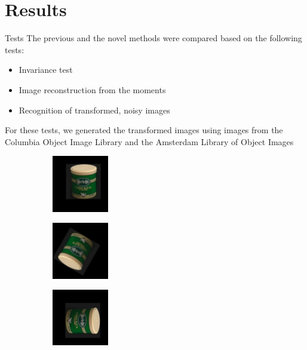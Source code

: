 \documentclass{beamer}
\begin{document}
\section{Results}
\begin{frame}{Tests}
    \vskip 5mm
    The previous and the novel methods were compared based on the following tests:
    \begin{itemize}
    \item Invariance test
    \item Image reconstruction from the moments
    \item Recognition of transformed, noisy images
    \end{itemize}
    For these tests, we generated the transformed images using images from the Columbia Object Image Library and the Amsterdam Library of Object Images
    \begin{figure}[tbp]
        \begin{subfigure}{0.3\textwidth}
            \centering
        \includegraphics[width=70pt]{figures/coil_rst/26x-11y9r0s1_0.png}
        \end{subfigure}
        \begin{subfigure}{0.3\textwidth}
            \centering
        \includegraphics[width=70pt]{figures/coil_rst/26x-11y9r150s0_5.png}
        \end{subfigure}
        \begin{subfigure}{0.3\textwidth}
            \centering
        \includegraphics[width=70pt]{figures/coil_rst/26x-11y9r270s1_75.png}
        \end{subfigure}
    \end{figure}
\end{frame}
\end{document}
